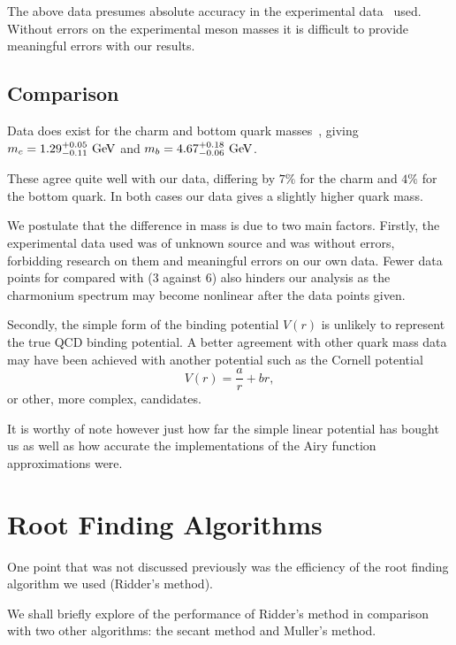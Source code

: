 \documentclass[]{article}
\begin{document}
The above data presumes absolute accuracy in the experimental data~\cite{ref:gdaniell} used. Without errors on the experimental meson masses it is difficult to provide meaningful errors with our results.

\subsection{Comparison}

Data does exist for the charm and bottom quark masses~\cite{ref:pdg}, giving $m_{c} = 1.29^{+0.05}_{-0.11}\GeV$ and $m_{b} = 4.67^{+0.18}_{-0.06}\GeV$.\footnotemark


These agree quite well with our data, differing by $7\%$ for the charm and $4\%$ for the bottom quark. In both cases our data gives a slightly higher quark mass.

We postulate that the difference in mass is due to two main factors. Firstly, the experimental data used was of unknown source and was without errors, forbidding research on them and meaningful errors on our own data. Fewer data points for \ccbar compared with \bbbar (3 against 6) also hinders our analysis as the charmonium spectrum may become nonlinear after the data points given.

Secondly, the simple form of the binding potential $V(r)$ is unlikely to represent the true QCD binding potential. A better agreement with other quark mass data may have been achieved with another potential such as the Cornell potential~\cite{ref:eichten}
\[
V(r) = \frac{a}{r} + br,
\]
or other, more complex, candidates.

It is worthy of note however just how far the simple linear potential has bought us as well as how accurate the implementations of the Airy function approximations were.

\section{Root Finding Algorithms}

One point that was not discussed previously was the efficiency of the root finding algorithm we used (Ridder's method).

We shall briefly explore of the performance of Ridder's method in comparison with two other algorithms: the secant method and Muller's method.
\end{document}

